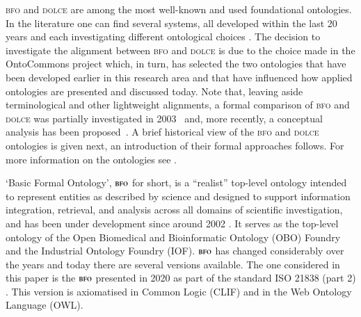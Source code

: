 \documentclass[ao]{iosart2x}
\newcommand{\nb}[1]{\textcolor{red}{$|$}\marginpar{\hspace*{-0cm}\parbox{20mm}{\scriptsize\raggedright\textcolor{red}{#1}}}}
\newcommand{\dolce}{{\textsc{dolce}}}
\newcommand{\bfo}{{\textsc{bfo}}}
\begin{document}
{\bfo} and {\dolce} are among the most well-known and used foundational ontologies. In the literature one can find several systems, all developed within the last 20 years and each investigating different ontological choices \citep{Borgo-GK2022FOinAction}. %
The decision to investigate the alignment between {\bfo} and {\dolce} is due to the choice made in the OntoCommons project which, in turn, has selected the two ontologies that have been developed earlier in this research area and that have influenced how applied ontologies are presented and discussed today. Note that, leaving aside terminological and other lightweight alignments, a formal comparison of {\bfo} and {\dolce} was partially investigated in 2003~\citep{D18} and, more recently, a conceptual analysis has been proposed~\citep{Guarino-2017BfoDolce}. %
A brief historical view of the {\bfo} and {\dolce} ontologies is given next, an introduction of their formal approaches follows. For more information on the ontologies see \citep{ISO21838, Borgo-GK2022FOinAction}.


`Basic Formal Ontology', $\bfo$ for short, is a ``realist'' top-level ontology intended to represent entities as described by science and designed to support information integration, retrieval, and analysis across all domains of scientific investigation, and has been under development since around 2002  \citep{grenonBiodynamic2004}. %
It serves as the top-level ontology of the Open Biomedical and Bioinformatic Ontology (OBO) Foundry and the Industrial Ontology Foundry (IOF). $\bfo$ has changed considerably over the years and today there are several versions available.
The one considered in this paper is the $\bfo$ presented in 2020 as part of the standard ISO 21838 (part 2) \citep{ISO21838}. This version is axiomatised in Common Logic (CLIF) \citep{ISO24707} and in the Web Ontology Language (OWL).
\end{document}
